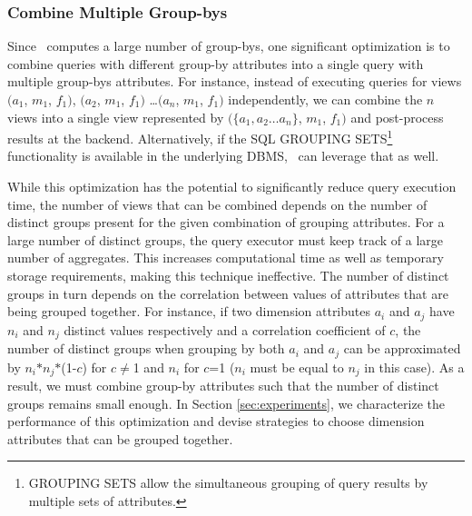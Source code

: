 \subsubsection {Combine Multiple Group-bys}
\label{subsec:mult_gb}
  Since \SeeDB\ computes a large number of group-bys, one significant
  optimization is to combine queries with different group-by attributes into a
  single query with multiple group-bys attributes.
  For instance, instead of executing queries for views $(a_1$, $m_1$, $f_1)$,
  $(a_2$, $m_1$, $f_1)$ \ldots $(a_n$, $m_1$, $f_1)$ independently, we can
  combine the $n$ views into a single view represented by $(\{a_1, a_2\ldots
  a_n\}$, $m_1$, $f_1)$ and post-process results at the backend. Alternatively,
  if the SQL GROUPING SETS\footnote{GROUPING SETS allow the simultaneous
  grouping of query results by multiple sets of attributes.} functionality is
  available in the underlying DBMS, \SeeDB\ can leverage that as well.

  While this optimization has the potential to significantly reduce query
  execution time, the number of views that can be combined depends on the
  number of distinct groups present for the given combination of grouping
  attributes. 
  For a large number of distinct groups, the query executor must
  keep track of a large number of aggregates. 
  This increases computational time
  as well as temporary storage requirements, making this technique ineffective.
  The number of distinct groups in turn depends on the correlation between
  values of attributes that are being grouped together. 
  For instance, if two
  dimension attributes $a_i$ and $a_j$ have $n_i$ and $n_j$ distinct values
  respectively and a correlation coefficient of $c$, the number of distinct
  groups when grouping by both $a_i$ and $a_j$ can be approximated by
  $n_i$$\ast$$n_j$$\ast$(1-$c$) for $c$$\neq$1 and $n_i$ for $c$=1 ($n_i$ must
  be equal to $n_j$ in this case).
  As a result, we must combine group-by attributes such that the number of
  distinct groups remains small enough. 
  In Section \ref{sec:experiments}, we
  characterize the performance of this optimization and devise strategies to
  choose dimension attributes that can be grouped together.
  
  
  


